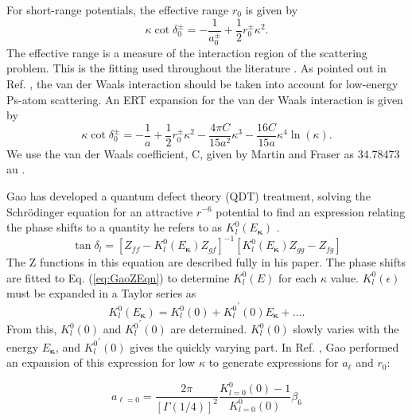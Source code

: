 \documentclass[reprint,showpacs,preprintnumbers,amsmath,amssymb,pra,aps]{revtex4-1}
\begin{document}
For short-range potentials, the effective range $r_0$ is given by \cite{Bethe1949,Blatt1949}
\begin{equation}
\label{eq:EffectiveRangeShort}
\kappa \cot\delta_0^\pm = -\frac{1}{a_0^\pm} + \frac{1}{2} r_0^\pm \kappa^2.
\end{equation}
The effective range is a measure of the interaction region of the scattering problem. This is the fitting used throughout the literature \cite{Ivanov2002,VanReeth2003,Blackwood2002,Walters2004}. As pointed out in Ref. \cite{Fabrikant2014}, the van der Waals interaction should be taken into account for low-energy Ps-atom scattering. An ERT expansion for the van der Waals interaction is given by \cite{Drake2006}
\begin{equation}
\label{eq:EffectiveRangeLongAu}
\kappa \cot\delta_0^\pm = -\frac{1}{a} + \frac{1}{2} r_0^\pm \kappa^2 - \frac{4 \pi C}{15 a^2} \kappa^3 - \frac{16 C}{15 a} \kappa^4 \ln \left(\kappa \right).
\end{equation}
We use the van der Waals coefficient, C, given by Martin and Fraser as 34.78473 au \cite{Martin1980}.

Gao has developed a quantum defect theory (QDT) treatment, solving the Schr\"{o}dinger equation for an attractive $r^{-6}$ potential to find an expression relating the phase shifts to a quantity he refers to as $K_l^0(E_{\bm \kappa})$ \cite{Gao1998}.
\begin{equation}
\label{eq:GaoZEqn}
\tan\delta_l = [Z_{ff} - K_l^0(E_{\bm \kappa}) Z_{gf}]^{-1} [K_l^0(E_{\bm \kappa}) Z_{gg} - Z_{fg}]
\end{equation}
The Z functions in this equation are described fully in his paper. The phase shifts are fitted to Eq. (\ref{eq:GaoZEqn}) to determine $K_l^0(E)$ for each $\kappa$ value. $K_l^0(\epsilon)$ must be expanded in a Taylor series as
\begin{equation}
\label{eq:GaoKTaylor}
K_l^0(E_{\bm \kappa}) = K_l^0(0) + {K_l^0}^\prime(0) E_{\bm \kappa} + \ldots.
\end{equation}
From this, $K_l^0(0)$ and ${K_l^0}^\prime(0)$ are determined. $K_l^0(0)$ slowly varies with the energy $E_{\bm \kappa}$, and ${K_l^0}^\prime(0)$ gives the quickly varying part. In Ref. \cite{Gao1998a}, Gao performed an expansion of this expression for low $\kappa$ to generate expressions for $a_\ell$ and $r_0$:

\begin{equation}
\label{eq:GaoScatLenS}
a_{\ell=0} = \frac{2\pi}{[\Gamma(1/4)]^2} \frac{K_{l=0}^0(0) - 1}{K_{l=0}^0(0)} \beta_6
\end{equation}
\end{document}

